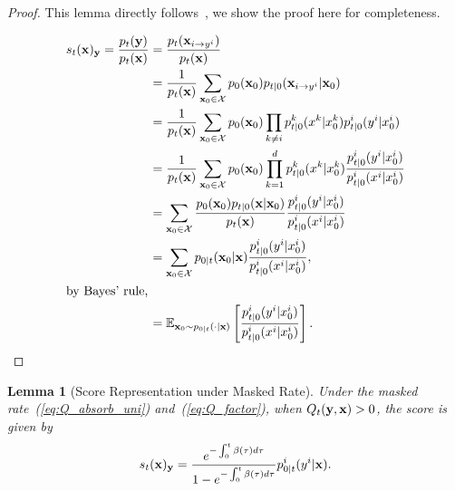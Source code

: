 \documentclass{article} %
\newtheorem{lemma}[theorem]{Lemma}
\def\eqref#1{equation~\ref{#1}}
\newcommand{\bfx}{{\bf x}}
\newcommand{\bfy}{ {\bf y}}
\renewcommand{\eqref}[1]{\textup{(\ref{#1})}}
\begin{document}
\begin{proof}
    This lemma directly follows~\cite[Lemma~2]{chen2025convergence}, we show the proof here for completeness.

    \begin{align*}
        s_t(\bfx)_\bfy = \frac{p_t(\bfy)}{p_t(\bfx)} &=  \frac{p_t(\bfx_{i \to y^i})}{p_t(\bfx)} \\
        &= \frac{1}{p_t(\bfx)} \sum_{\bfx_0 \in \mathcal{X}} p_0(\bfx_0) p_{t|0}(\bfx_{i \to y^i}|\bfx_0) \\
        &= \frac{1}{p_t(\bfx)} \sum_{\bfx_0 \in \mathcal{X}} p_0(\bfx_0) \prod_{k \neq i} p^k_{t|0}(x^k|x^k_0) p^i_{t|0}(y^i|x^i_0) \\
        &= \frac{1}{p_t(\bfx)} \sum_{\bfx_0 \in \mathcal{X}} p_0(\bfx_0) \prod_{k=1}^d p^k_{t|0}(x^k|x^k_0) \frac{p^i_{t|0}(y^i|x^i_0)}{p^i_{t|0}(x^i|x^i_0)} \\
        &= \sum_{\bfx_0 \in \mathcal{X}} \frac{p_0(\bfx_0) p_{t|0}(\bfx|\bfx_0)}{p_t(\bfx)} \frac{p^i_{t|0}(y^i|x^i_0)}{p^i_{t|0}(x^i|x^i_0)} \\
        &= \sum_{\bfx_0 \in \mathcal{X}}  p_{0|t}(\bfx_0|\bfx) \frac{p^i_{t|0}(y^i|x^i_0)}{p^i_{t|0}(x^i|x^i_0)}, \\
        \intertext{by Bayes' rule,}
        &= \mathbb{E}_{\bfx_0 \sim p_{0|t}(\cdot | \bfx)} \left[ \frac{p^i_{t|0}(y^i|x^i_0)}{p^i_{t|0}(x^i|x^i_0)} \right].
    \end{align*}
\end{proof}

\begin{lemma}[Score Representation under Masked Rate]\label{lemma:score_repre_masked}
    Under the masked rate~\eqref{eq:Q_absorb_uni} and~\eqref{eq:Q_factor}, when $Q_t(\bfy, \bfx)>0$, the score is given by
    \[
    s_t(\bfx)_\bfy = \frac{e^{-\int_0^t \beta(\tau) d\tau}}{1-e^{-\int_0^t \beta(\tau) d\tau}} p_{0|t}^i (y^i|\bfx).
    \]
\end{lemma}
\end{document}
